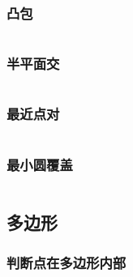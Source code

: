 \documentclass[a4paper]{article}
\newcommand{\cppcode}[1]{
    \inputminted[mathescape,
    frame=lines,linenos]{cpp}{source/#1}
}
\begin{document}
\cppcode{computational-geometry/point.cpp}

\subsubsection{凸包}

\cppcode{computational-geometry/convex-hull.cpp}

\subsubsection{半平面交}
\cppcode{computational-geometry/halfplaneintersection.cpp}

\subsubsection{最近点对}
\cppcode{computational-geometry/closest-pair-of-points.cpp}

\subsubsection{最小圆覆盖}
\cppcode{computational-geometry/mincir.cpp}





\subsection{多边形}

\subsubsection{判断点在多边形内部}

\cppcode{computational-geometry/point-in-polygon.cpp}
\end{document}
